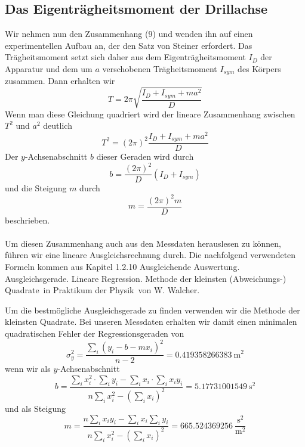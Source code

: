 \subsection{Das Eigenträgheitsmoment der Drillachse}
Wir nehmen nun den Zusammenhang (9) und wenden ihn auf einen experimentellen Aufbau an, der den Satz von Steiner erfordert. Das Trägheitsmoment setzt sich daher aus dem Eigenträgheitsmoment $I_D$ der Apparatur und dem um $a$ verschobenen Trägheitsmoment $I_{sym}$ des Körpers zusammen. Dann erhalten wir
\begin{equation}
	T = 2 \pi \sqrt{\frac{I_D + I_{sym} + m a^2}{D}}
\end{equation}
Wenn man diese Gleichung quadriert wird der lineare Zusammenhang zwischen $ T^2 $ und $ a^2 $ deutlich
\begin{equation}
		T^2 = (2\pi)^2\frac{I_D + I_{sym} + m a^2}{D}
\end{equation}
Der $y$-Achsenabschnitt $b$ dieser Geraden wird durch
\begin{equation}
	b = \frac{(2\pi)^2}{D}(I_D + I_{sym})
\end{equation}
und die Steigung $m$ durch
\begin{equation}
	m = \frac{(2\pi)^2m}{D}
\end{equation}
beschrieben. \\
\ \\
Um diesen Zusammenhang auch aus den Messdaten herauslesen zu können, führen wir eine lineare Ausgleichsrechnung durch. Die nachfolgend verwendeten Formeln kommen aus Kapitel 1.2.10 \glqq Ausgleichende Auswertung. Ausgleichsgerade. Lineare Regression. Methode der kleinsten (Abweichungs-) Quadrate\grqq\ in \glqq Praktikum der Physik\grqq\ von W. Walcher.

Um die bestmögliche Ausgleichsgerade zu finden verwenden wir die Methode der kleinsten Quadrate. Bei unseren Messdaten erhalten wir damit einen minimalen quadratischen Fehler der Regressionsgeraden von
\begin{equation}
	\sigma_y^2 = \frac{\sum_i(y_i-b-mx_i)^2}{n-2} = 0.419358266383\ \text{m}^2
\end{equation}
wenn wir als $y$-Achsenabschnitt
\begin{equation}
	b = \frac{\sum_i x_i^2\cdot\sum_i y_i-\sum_i x_i\cdot\sum_i x_iy_i}{n\sum_ix_i^2-\left(\sum_ix_i\right)^2} = 5.17731001549\ \text{s}^2
\end{equation}
und als Steigung
\begin{equation}
	m = \frac{n\sum_ix_iy_i-\sum_ix_i\sum_iy_i}{n\sum_ix_i^2-\left(\sum_ix_i\right)^2} = 665.524369256\ \frac{\text{s}^2}{\text{m}^2}
\end{equation}
